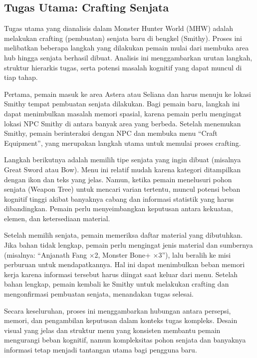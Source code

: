 \documentclass[12pt]{article}
\begin{document}
\subsection{Tugas Utama: Crafting Senjata}

Tugas utama yang dianalisis dalam Monster Hunter World (MHW) adalah melakukan crafting (pembuatan) senjata baru di bengkel (Smithy). Proses ini melibatkan beberapa langkah yang dilakukan pemain mulai dari membuka area hub hingga senjata berhasil dibuat. Analisis ini menggambarkan urutan langkah, struktur hierarkis tugas, serta potensi masalah kognitif yang dapat muncul di tiap tahap.

Pertama, pemain masuk ke area Astera atau Seliana dan harus menuju ke lokasi Smithy tempat pembuatan senjata dilakukan. Bagi pemain baru, langkah ini dapat menimbulkan masalah memori spasial, karena pemain perlu mengingat lokasi NPC Smithy di antara banyak area yang berbeda. Setelah menemukan Smithy, pemain berinteraksi dengan NPC dan membuka menu “Craft Equipment”, yang merupakan langkah utama untuk memulai proses crafting.

Langkah berikutnya adalah memilih tipe senjata yang ingin dibuat (misalnya Great Sword atau Bow). Menu ini relatif mudah karena kategori ditampilkan dengan ikon dan teks yang jelas. Namun, ketika pemain menelusuri pohon senjata (Weapon Tree) untuk mencari varian tertentu, muncul potensi beban kognitif tinggi akibat banyaknya cabang dan informasi statistik yang harus dibandingkan. Pemain perlu menyeimbangkan keputusan antara kekuatan, elemen, dan ketersediaan material.

Setelah memilih senjata, pemain memeriksa daftar material yang dibutuhkan. Jika bahan tidak lengkap, pemain perlu mengingat jenis material dan sumbernya (misalnya: “Anjanath Fang ×2, Monster Bone+ ×3”), lalu beralih ke misi perburuan untuk mendapatkannya. Hal ini dapat menimbulkan beban memori kerja karena informasi tersebut harus diingat saat keluar dari menu. Setelah bahan lengkap, pemain kembali ke Smithy untuk melakukan crafting dan mengonfirmasi pembuatan senjata, menandakan tugas selesai.

Secara keseluruhan, proses ini menggambarkan hubungan antara persepsi, memori, dan pengambilan keputusan dalam konteks tugas kompleks. Desain visual yang jelas dan struktur menu yang konsisten membantu pemain mengurangi beban kognitif, namun kompleksitas pohon senjata dan banyaknya informasi tetap menjadi tantangan utama bagi pengguna baru.
\end{document}
